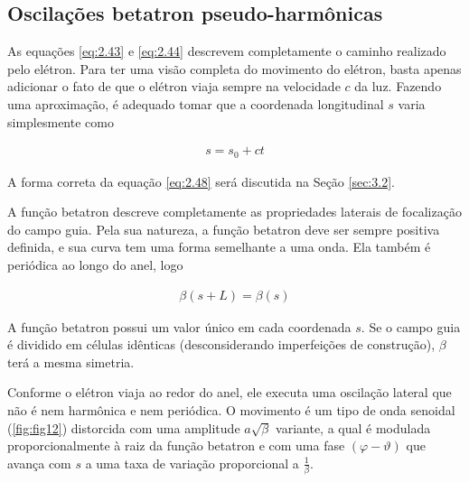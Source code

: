 \subsection{Oscilações betatron pseudo-harmônicas}\label{sec:2.6}
As equações \eqref{eq:2.43} e \eqref{eq:2.44} descrevem completamente o caminho realizado pelo elétron. Para ter uma visão completa do movimento do elétron, basta apenas adicionar o fato de que o elétron viaja sempre na velocidade $c$ da luz. Fazendo uma aproximação, é adequado tomar que a coordenada longitudinal $s$ varia simplesmente como
	
\begin{align}
	s = s_0 + ct\label{eq:2.48}
\end{align}
	
A forma correta da equação \eqref{eq:2.48} será discutida na Seção \ref{sec:3.2}.
	
A função betatron descreve completamente as propriedades laterais de focalização do campo guia. Pela sua natureza, a função betatron deve ser sempre positiva definida, e sua curva tem uma forma semelhante a uma onda. Ela também é periódica ao longo do anel, logo
	
\begin{align}
	\beta(s+L) = \beta(s)
\end{align}
	
A função betatron possui um valor único em cada coordenada $s$. Se o campo guia é dividido em células idênticas (desconsiderando imperfeições de construção), $\beta$ terá a mesma simetria.
	
Conforme o elétron viaja ao redor do anel, ele executa uma oscilação lateral que não é nem harmônica e nem periódica. O movimento é um tipo de onda senoidal (\ref{fig:fig12}) distorcida com uma amplitude $a\sqrt{\beta}$ variante, a qual é modulada proporcionalmente à raiz da função betatron e com uma fase $(\varphi-\vartheta)$ que avança com $s$ a uma taxa de variação proporcional a $\frac{1}{\beta}$.
	
